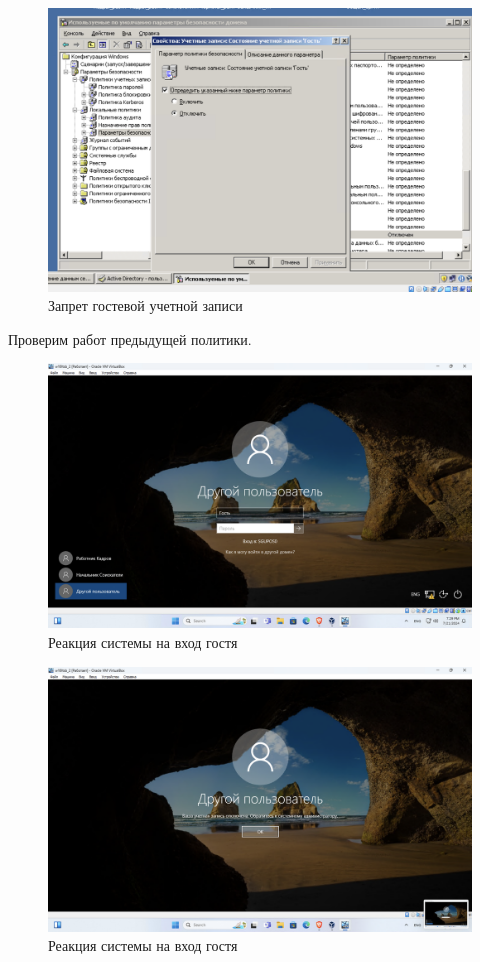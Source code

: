 \begin{figure}[H]
  \centering
  \includegraphics[width=1\textwidth]{pict/prac/60}
  \caption{Запрет гостевой учетной записи}
\end{figure}

Проверим работ предыдущей политики.
\begin{figure}[H]
  \centering
  \includegraphics[width=1\textwidth]{pict/prac/65}
  \caption{Реакция системы на вход гостя}
\end{figure}

\begin{figure}[H]
  \centering
  \includegraphics[width=1\textwidth]{pict/prac/66}
  \caption{Реакция системы на вход гостя}
\end{figure}

